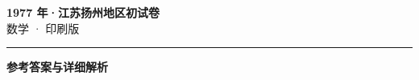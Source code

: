 \documentclass[zihao=5, a4paper]{ctexart}
\begin{document}
\begin{center}
  {\Large\bfseries 1977 年·江苏扬州地区初试卷}\\[4pt]
  {\large 数学 · 印刷版}
\end{center}
\medskip
{}

\par\bigskip\hrule\bigskip
{}
\begin{center}{\large\bfseries 参考答案与详细解析}\end{center}
\smallskip

\end{document}
